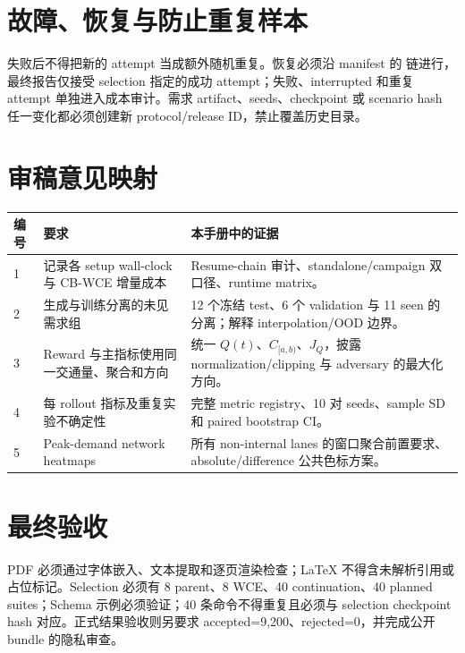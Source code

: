 \section{故障、恢复与防止重复样本}
失败后不得把新的 attempt 当成额外随机重复。恢复必须沿 manifest 的  链进行，最终报告仅接受 selection 指定的成功 attempt；失败、interrupted 和重复 attempt 单独进入成本审计。需求 artifact、seeds、checkpoint 或 scenario hash 任一变化都必须创建新 protocol/release ID，禁止覆盖历史目录。

\section{审稿意见映射}
\begin{longtable}{@{}p{}p{}p{}@{}}
\toprule
编号 & 要求 & 本手册中的证据 \\
\midrule
1 & 记录各 setup wall-clock 与 CB-WCE 增量成本 & Resume-chain 审计、standalone/campaign 双口径、runtime matrix。\\
2 & 生成与训练分离的未见需求组 & 12 个冻结 test、6 个 validation 与 11 seen 的分离；解释 interpolation/OOD 边界。\\
3 & Reward 与主指标使用同一交通量、聚合和方向 & 统一 $Q(t)$、$C_{[a,b)}$、$J_Q$，披露 normalization/clipping 与 adversary 的最大化方向。\\
4 & 每 rollout 指标及重复实验不确定性 & 完整 metric registry、10 对 seeds、sample SD 和 paired bootstrap CI。\\
5 & Peak-demand network heatmaps & 所有 non-internal lanes 的窗口聚合前置要求、absolute/difference 公共色标方案。\\
\bottomrule
\end{longtable}

\section{最终验收}
PDF 必须通过字体嵌入、文本提取和逐页渲染检查；LaTeX 不得含未解析引用或占位标记。Selection 必须有 8 parent、8 WCE、40 continuation、40 planned suites；Schema 示例必须验证；40 条命令不得重复且必须与 selection checkpoint hash 对应。正式结果验收则另要求 accepted=9,200、rejected=0，并完成公开 bundle 的隐私审查。

